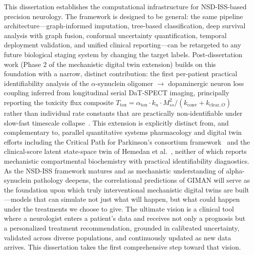 This dissertation establishes the computational infrastructure for NSD-ISS-based precision neurology. The framework is designed to be general: the same pipeline architecture---graph-informed imputation, tree-based classification, deep survival analysis with graph fusion, conformal uncertainty quantification, temporal deployment validation, and unified clinical reporting---can be retargeted to any future biological staging system by changing the target labels. Post-dissertation work (Phase 2 of the mechanistic digital twin extension) builds on this foundation with a narrow, distinct contribution: the first per-patient practical identifiability analysis of the $\alpha$-synuclein oligomer $\to$ dopaminergic neuron loss coupling inferred from longitudinal serial DaT-SPECT imaging, principally reporting the toxicity flux composite $T_{\text{tox}} = \alpha_{\text{tox}} \cdot k_n \cdot M_{ss}^2 / (k_{\text{conv}} + k_{\text{clear},O})$ rather than individual rate constants that are practically non-identifiable under slow-fast timescale collapse~\cite{villaverde2016,raue2009,gutenkunst2007,transtrum2015}. This extension is explicitly distinct from, and complementary to, parallel quantitative systems pharmacology and digital twin efforts including the Critical Path for Parkinson's consortium framework~\cite{denaro2024} and the clinical-score latent state-space twin of Hemedan et al.~\cite{hemedan2026}, neither of which reports mechanistic compartmental biochemistry with practical identifiability diagnostics. As the NSD-ISS framework matures and as mechanistic understanding of alpha-synuclein pathology deepens, the correlational predictions of GIMAN will serve as the foundation upon which truly interventional mechanistic digital twins are built---models that can simulate not just what will happen, but what could happen under the treatments we choose to give. The ultimate vision is a clinical tool where a neurologist enters a patient's data and receives not only a prognosis but a personalized treatment recommendation, grounded in calibrated uncertainty, validated across diverse populations, and continuously updated as new data arrives. This dissertation takes the first comprehensive step toward that vision.
